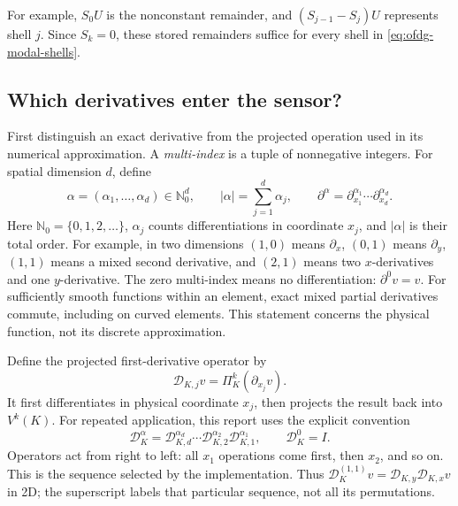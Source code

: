 For example, $S_0U$ is the nonconstant remainder, and
$(S_{j-1}-S_j)U$ represents shell $j$. Since $S_k=0$, these stored
remainders suffice for every shell in \cref{eq:ofdg-modal-shells}.

\subsection{Which derivatives enter the sensor?}
\label{sec:projected-derivatives}
First distinguish an exact derivative from the projected operation used in
its numerical approximation. A \emph{multi-index} is a tuple of nonnegative
integers. For spatial dimension $d$, define
\begin{equation}
 \alpha=(\alpha_1,\ldots,\alpha_d)\in\mathbb N_0^d,\qquad
 |\alpha|=\sum_{j=1}^d\alpha_j,\qquad
 \partial^\alpha=\partial_{x_1}^{\alpha_1}\cdots
                         \partial_{x_d}^{\alpha_d}.
 \label{eq:derivative-multi-index}
\end{equation}
Here $\mathbb N_0=\{0,1,2,\ldots\}$, $\alpha_j$ counts differentiations in
coordinate $x_j$, and $|\alpha|$ is their total order. For example, in two
dimensions $(1,0)$ means $\partial_x$, $(0,1)$ means $\partial_y$,
$(1,1)$ means a mixed second derivative, and $(2,1)$ means two
$x$-derivatives and one $y$-derivative. The zero multi-index means no
differentiation: $\partial^0v=v$. For sufficiently smooth functions within
an element, exact mixed partial derivatives commute, including on curved
elements. This statement concerns the physical function, not its discrete
approximation.

Define the projected first-derivative operator by
\begin{equation}
 \mathscr D_{K,j}v=\Pi_K^k(\partial_{x_j}v).
 \label{eq:projected-first-derivative}
\end{equation}
It first differentiates in physical coordinate $x_j$, then projects the result
back into $V^k(K)$. For repeated application, this report uses the explicit
convention
\begin{equation}
 \mathscr D_K^\alpha
 =\mathscr D_{K,d}^{\alpha_d}\cdots
   \mathscr D_{K,2}^{\alpha_2}\mathscr D_{K,1}^{\alpha_1},
 \qquad \mathscr D_K^0=I.
 \label{eq:projected-multi-index-order}
\end{equation}
Operators act from right to left: all $x_1$ operations come first, then
$x_2$, and so on. This is the sequence selected by the implementation.
Thus $\mathscr D_K^{(1,1)}v=\mathscr D_{K,y}\mathscr D_{K,x}v$ in 2D;
the superscript labels that particular sequence, not all its permutations.

